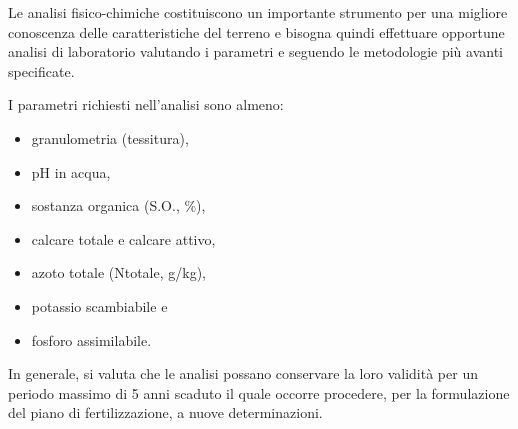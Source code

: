 \documentclass[
]{book}
\theoremstyle{definition}
\theoremstyle{definition}
\theoremstyle{definition}
\theoremstyle{definition}
\theoremstyle{remark}
\begin{document}
Le analisi fisico-chimiche costituiscono un importante strumento per una migliore conoscenza delle caratteristiche del terreno e bisogna quindi effettuare opportune analisi di laboratorio valutando i parametri e seguendo le metodologie più avanti specificate.

I parametri richiesti nell'analisi sono almeno:

\begin{itemize}
\item
  granulometria (tessitura),
\item
  pH in acqua,
\item
  sostanza organica (S.O., \%),
\item
  calcare totale e calcare attivo,
\item
  azoto totale (Ntotale, g/kg),
\item
  potassio scambiabile e
\item
  fosforo assimilabile.
\end{itemize}

In generale, si valuta che le analisi possano conservare la loro validità per un periodo massimo di 5 anni scaduto il quale occorre procedere, per la formulazione del piano di fertilizzazione, a nuove determinazioni.
\end{document}

